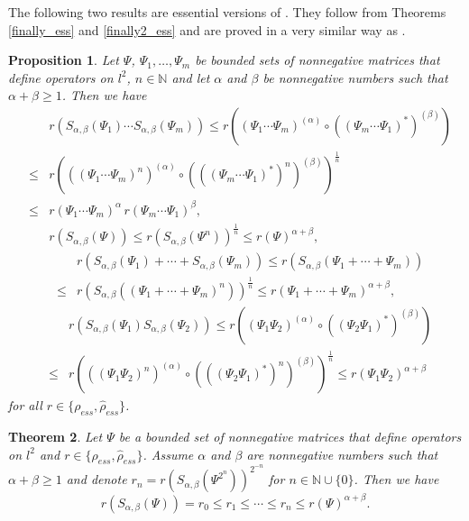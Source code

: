 \documentclass[12pt, reqno]{amsart}
\newtheorem{theorem}{Theorem}[section]
\newtheorem{proposition}[theorem]{Proposition}
\theoremstyle{definition}
\theoremstyle{remark}
\numberwithin{equation}{section}
\newcommand{\be}{\begin{equation}}
\newcommand{\ee}{\end{equation}}
\begin{document}
The following two results are essential versions of \cite[Proposition 4.4 and Theorem 4.3]{BP22b}. They follow from Theorems \ref{finally_ess} and \ref{finally2_ess} and are proved in a very similar way as \cite[Proposition 4.4 and Theorem 4.3]{BP22b}.
\begin{proposition}
Let $\Psi$, $\Psi_1, \ldots ,\Psi_m$ be bounded sets of nonnegative matrices that define operators on $l^2$, $n \in \mathbb{N}$ and let $\alpha$ and $\beta$ be nonnegative numbers such that $\alpha+\beta \ge 1$. Then we have
\begin{eqnarray}
\nonumber
& & r(S_{\alpha ,\beta} (\Psi_{1}) \cdots  S_{\alpha  ,\beta}(\Psi_{m})) 
\le  r\left((\Psi_1 \cdots \Psi_m )^{(\alpha)} \circ ((\Psi_m \cdots \Psi_1)^*)^{(\beta)}  \right) \\
\nonumber
&\le & r\left(((\Psi_1 \cdots \Psi_m )^n)^{(\alpha)} \circ (((\Psi_m \cdots \Psi_1)^*)^n)^{(\beta)}\right)^{\frac{1}{n}}\\
&\le &  r(\Psi_1 \cdots \Psi_m )^{\alpha} \,  r(\Psi_m \cdots \Psi_1 )^{\beta}, 
\label{geom_sym_prva} \\
& & r(S_{\alpha, \beta}(\Psi)) \le r(S_{\alpha, \beta}(\Psi ^n))^{\frac{1}{n}}\le r(\Psi)^{\alpha+\beta},
\label{geom_sym_druga}
\end{eqnarray}
\begin{eqnarray}
\nonumber
& & r(S_{\alpha  ,\beta}(\Psi_1)+ \cdots + S_{\alpha  ,\beta}(\Psi_m)) \le r\left(S_{\alpha  ,\beta}(\Psi_1+ \cdots+ \Psi_m)\right) \\
&\le & r\left(S_{\alpha  ,\beta}((\Psi_1+ \cdots+ \Psi_m)^{n})\right)^{\frac{1}{n}} \le r(\Psi_1+ \cdots+ \Psi_m)^{\alpha + \beta},
\label{geom_sym_treca}
\end{eqnarray}
\begin{eqnarray}
\nonumber
& & r(S_{\alpha ,\beta}(\Psi_1)S_{\alpha ,\beta}(\Psi_2))\le r\left((\Psi_1 \Psi_2 )^{(\alpha)} \circ ((\Psi_2 \Psi_1)^*)^{(\beta)}  \right) \\
&\le & r\left(((\Psi_1 \Psi_2 )^n)^{(\alpha)} \circ (((\Psi_2 \Psi_1)^*)^n)^{(\beta)}\right)^{\frac{1}{n}}
\le r(\Psi_1\Psi_2)^{\alpha+\beta}
\label{geom_sym_cetvrta}
\end{eqnarray}
for all $r \in \{ \rho _{ess}, \hat{\rho}_{ess}\}$.
\end{proposition}
\begin{theorem}
\label{sym_matrices}
Let $\Psi$ be a bounded set of nonnegative matrices that define operators on $l^2$ and $r \in \{ \rho _{ess}, \hat{\rho} _{ess}\}$. Assume $\alpha$ and $\beta$  are nonnegative numbers such that $\alpha+\beta \ge 1$ and denote $r_n=r(S_{\alpha,\beta}(\Psi^{2^n}))^{2^{-n}}$ for $n \in \mathbb{N}\cup \{0\}$. Then we have
\be
r(S_{\alpha, \beta}(\Psi))=r_{0}\le r_1\le \cdots \le r_n\le r(\Psi)^{\alpha+\beta}.
\label{finish}
\ee
\end{theorem}
\end{document}
